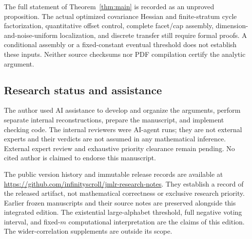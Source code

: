 The full statement of Theorem~\ref{thm:main} is recorded as an unproved
proposition. The actual optimized covariance Hessian and finite-stratum
cycle factorization, quantitative offset control, complete facet/cap
assembly, dimension-and-noise-uniform localization,
and discrete transfer still require formal proofs. A conditional assembly
or a fixed-constant eventual threshold does not establish these inputs.
Neither source checksums nor PDF compilation certify the analytic argument.

\subsection{Research status and assistance}
The author used AI assistance to develop and organize the arguments,
perform separate internal reconstructions, prepare the manuscript, and
implement checking code. The internal reviewers were AI-agent runs;
they are not external experts and their verdicts are not assumed in any
mathematical inference. External expert review and exhaustive priority
clearance remain pending. No cited author is claimed to endorse this
manuscript.

The public version history and immutable release records are available at
\url{https://github.com/infinityscroll/jmlr-research-notes}.
They establish a record of the released artifact, not mathematical
correctness or exclusive research priority. Earlier frozen manuscripts
and their source notes are preserved alongside this integrated edition.
The existential large-alphabet threshold, full negative voting interval,
and fixed-$m$ computational interpretation are the claims of this edition.
The wider-correlation supplements are outside its scope.
